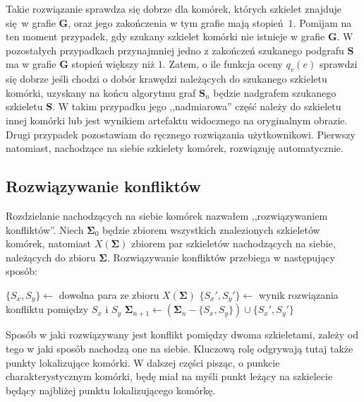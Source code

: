 \documentclass[declaration,shortabstract,mgr]{iithesis}
\begin{document}
Takie rozwiązanie sprawdza się dobrze dla komórek, których szkielet znajduje się w grafie $\mathbf{G}$, oraz jego zakończenia w tym grafie mają stopień $1$. Pomijam na ten moment przypadek, gdy szukany szkielet komórki nie istnieje w grafie $\mathbf{G}$. W pozostałych przypadkach przynajmniej jedno z zakończeń szukanego podgrafu $\mathbf{S}$ ma w grafie $\mathbf{G}$ stopień większy niż $1$. Zatem, o ile funkcja oceny $q_v(e)$ sprawdzi się dobrze jeśli chodzi o dobór krawędzi należących do szukanego szkieletu komórki, uzyskany na końcu algorytmu graf $\mathbf{S}_n$ będzie nadgrafem szukanego szkieletu $\mathbf{S}$. W takim przypadku jego ,,nadmiarowa'' część należy do szkieletu innej komórki lub jest wynikiem artefaktu widocznego na oryginalnym obrazie. Drugi przypadek pozostawiam do ręcznego rozwiązania użytkownikowi. Pierwszy natomiast, nachodzące na siebie szkielety komórek, rozwiązuję automatycznie.

\subsection{Rozwiązywanie konfliktów}
\label{sec:fix-conflicts}

Rozdzielanie nachodzących na siebie komórek nazwałem ,,rozwiązywaniem konfliktów''. Niech $\mathbf{\Sigma}_0$ będzie zbiorem wszystkich znalezionych szkieletów komórek, natomiast $X(\mathbf{\Sigma})$ zbiorem par szkieletów nachodzących na siebie, należących do zbioru $\mathbf{\Sigma}$. Rozwiązywanie konfliktów przebiega w następujący sposób:

\par\bigskip
\begin{algorithmic}

  \STATE $\{S_x, S_y\} \gets$ dowolna para ze zbioru $X(\mathbf{\Sigma})$
  \STATE $\{S_x', S_y'\} \gets$ wynik rozwiązania konfliktu pomiędzy $S_x$ i $S_y$
  \STATE $\mathbf{\Sigma}_{n+1} \gets (\mathbf{\Sigma}_n - \{S_x, S_y\}) \cup \{S_x', S_y'\}$
\ENDWHILE

\end{algorithmic}
\par\bigskip

Sposób w jaki rozwiązywany jest konflikt pomiędzy dwoma szkieletami, zależy od tego w jaki sposób nachodzą one na siebie. Kluczową rolę odgrywają tutaj także punkty lokalizujące komórki. W dalszej części pisząc, o punkcie charakterystycznym komórki, będę miał na myśli punkt leżący na szkielecie będący najbliżej punktu lokalizującego komórkę.
\end{document}
